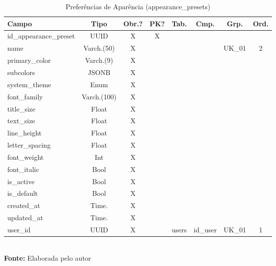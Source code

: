 \FloatBarrier
\begin{table}[!htbp]
\centering
\caption{Preferências de Aparência (appearance\_presets)}
\footnotesize
\begin{tabularx}{\textwidth}{ | X | c | c | c | c | c | c | c | }
    \hline
    \textbf{Campo} & \textbf{Tipo} & \textbf{Obr.?} & \textbf{PK?} & \textbf{Tab.} & \textbf{Cmp.} & \textbf{Grp.} & \textbf{Ord.}\\ \hline
    id\_appearance\_preset & UUID & X & X &  &  &  &  \\ \hline
    name & Varch.(50) & X &  &  &  & UK\_01 & 2 \\ \hline
    primary\_color & Varch.(9) & X &  &  &  &  &  \\ \hline
    subcolors & JSONB & X &  &  &  &  &  \\ \hline
    system\_theme & Enum & X &  &  &  &  &  \\ \hline
    font\_family & Varch.(100) & X &  &  &  &  &  \\ \hline
    title\_size & Float & X &  &  &  &  &  \\ \hline
    text\_size & Float & X &  &  &  &  &  \\ \hline
    line\_height & Float & X &  &  &  &  &  \\ \hline
    letter\_spacing & Float & X &  &  &  &  &  \\ \hline
    font\_weight & Int & X &  &  &  &  &  \\ \hline
    font\_italic & Bool & X &  &  &  &  &  \\ \hline
    is\_active & Bool & X &  &  &  &  &  \\ \hline
    is\_default & Bool & X &  &  &  &  &  \\ \hline
    created\_at & Time. & X &  &  &  &  &  \\ \hline
    updated\_at & Time. & X &  &  &  &  &  \\ \hline
    user\_id & UUID & X &  & users & id\_user & UK\_01 & 1 \\ \hline
\end{tabularx}
\vspace{0.1cm} \\ \textbf{Fonte:} Elaborada pelo autor
\label{tab:tabelaAppearancePresetDetalhado}
\end{table}


